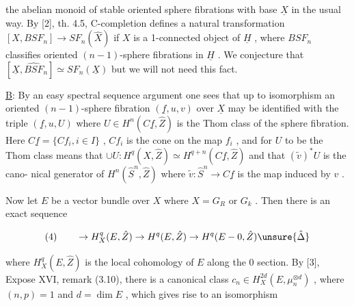 
the abelian monoid of stable oriented sphere fibrations with base
$\underline{X}$ in the usual way. By [2], th. 4.5, C-completion defines a
natural transformation $[X,BSF_n] \to SF_n(\hat{X})$ if $X$ is a 1-connected
object of $\underline{H}$ , where $BSF_n$ classifies oriented $(n - 1)$-sphere
fibrations in $\underline{H}$ . We conjecture that $[\underline{X},\widehat{BSF}_n] \simeq SF_n(\underline{X})$ but we
will not need this fact.

\underline{B}: By an easy spectral sequence argument one sees that up to
isomorphism an oriented $(n - 1)$-sphere fibration $(\underline{f},u,v)$ over $\underline{X}$
may be identified with the triple $(\underline{f},u,U)$ where $U \in H^n(C\underline{f},\hat{Z})$ is
the Thom class of the sphere fibration. Here $C\underline{f} = \{Cf_i, i \in I\}$ ,
$Cf_i$ is the cone on the map $f_i$ , and for $U$ to be the Thom class
means that $\cup U : H^q(X,\hat{Z}) \simeq H^{q+n}(C\underline{f},\hat{Z})$ and that $(\tilde{v})^*U$ is the cano-%
nical generator of $H^n(\hat{S}^n,\hat{Z})$ where $\tilde{v} : \hat{S}^n \to C\underline{f}$ is the map induced
by $v$ .

Now let $E$ be a vector bundle over $X$ where $X = G_R$ or $G_k$ .
Then there is an exact sequence

\[ (4) \qquad \to H^q_X(E,\hat{Z}) \to H^q(E,\hat{Z}) \to H^q(E - 0,\hat{Z}) \unsure{\hat{\Delta}} \]

where $H^q_X(E,\hat{Z})$ is the local cohomology of $E$ along the 0 section.
By [3], Expose XVI, remark (3.10), there is a canonical class
$c_n \in H^{2d}_X(E,\mu_n^{\otimes d})$ , where $(n,p) = 1$ and $d = \dim E$ , which gives
rise to an isomorphism

